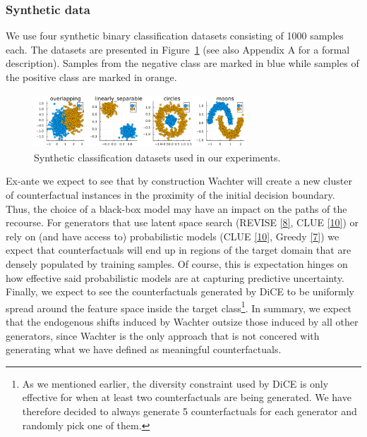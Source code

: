\documentclass[
  conference]{IEEEtran}
\begin{document}
\hypertarget{synthetic-data}{%
\subsubsection{Synthetic data}\label{synthetic-data}}

We use four synthetic binary classification datasets consisting of 1000
samples each. The datasets are presented in
Figure~\ref{fig-synthetic-data} (see also Appendix A for a formal
description). Samples from the negative class are marked in blue while
samples of the positive class are marked in orange.

\begin{figure}

{\centering \includegraphics[width=8cm,height=2cm]{www/synthetic_data.png}

}

\caption{\label{fig-synthetic-data}Synthetic classification datasets
used in our experiments.}

\end{figure}

Ex-ante we expect to see that by construction Wachter will create a new
cluster of counterfactual instances in the proximity of the initial
decision boundary. Thus, the choice of a black-box model may have an
impact on the paths of the recourse. For generators that use latent
space search (REVISE \protect\hyperlink{ref-joshi2019towards}{{[}8{]}},
CLUE \protect\hyperlink{ref-antoran2020getting}{{[}10{]}}) or rely on
(and have access to) probabilistic models (CLUE
\protect\hyperlink{ref-antoran2020getting}{{[}10{]}}, Greedy
\protect\hyperlink{ref-schut2021generating}{{[}7{]}}) we expect that
counterfactuals will end up in regions of the target domain that are
densely populated by training samples. Of course, this is expectation
hinges on how effective said probabilistic models are at capturing
predictive uncertainty. Finally, we expect to see the counterfactuals
generated by DiCE to be uniformly spread around the feature space inside
the target class\footnote{As we mentioned earlier, the diversity
  constraint used by DiCE is only effective for when at least two
  counterfactuals are being generated. We have therefore decided to
  always generate 5 counterfactuals for each generator and randomly pick
  one of them.}. In summary, we expect that the endogenous shifts
induced by Wachter outsize those induced by all other generators, since
Wachter is the only approach that is not concered with generating what
we have defined as meaningful counterfactuals.
\end{document}
